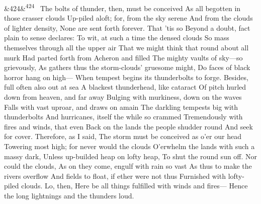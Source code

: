 \documentclass[12pt]{article}
\newcommand{\para}[1][]{\par\noindent\ifx&#1&\else\textsuperscript{\footnotesize #1}~\fi}
\begin{document}
\para[424] The bolts of thunder, then, must be conceived As all begotten in those crasser clouds Up-piled aloft; for, from the sky serene And from the clouds of lighter density, None are sent forth forever. That 'tis so Beyond a doubt, fact plain to sense declares: To wit, at such a time the densed clouds So mass themselves through all the upper air That we might think that round about all murk Had parted forth from Acheron and filled The mighty vaults of sky---so grievously, As gathers thus the storm-clouds' gruesome might, Do faces of black horror hang on high--- When tempest begins its thunderbolts to forge. Besides, full often also out at sea A blackest thunderhead, like cataract Of pitch hurled down from heaven, and far away Bulging with murkiness, down on the waves Falls with vast uproar, and draws on amain The darkling tempests big with thunderbolts And hurricanes, itself the while so crammed Tremendously with fires and winds, that even Back on the lands the people shudder round And seek for cover. Therefore, as I said, The storm must be conceived as o'er our head Towering most high; for never would the clouds O'erwhelm the lands with such a massy dark, Unless up-builded heap on lofty heap, To shut the round sun off. Nor could the clouds, As on they come, engulf with rain so vast As thus to make the rivers overflow And fields to float, if ether were not thus Furnished with lofty-piled clouds. Lo, then, Here be all things fulfilled with winds and fires--- Hence the long lightnings and the thunders loud.
\end{document}
